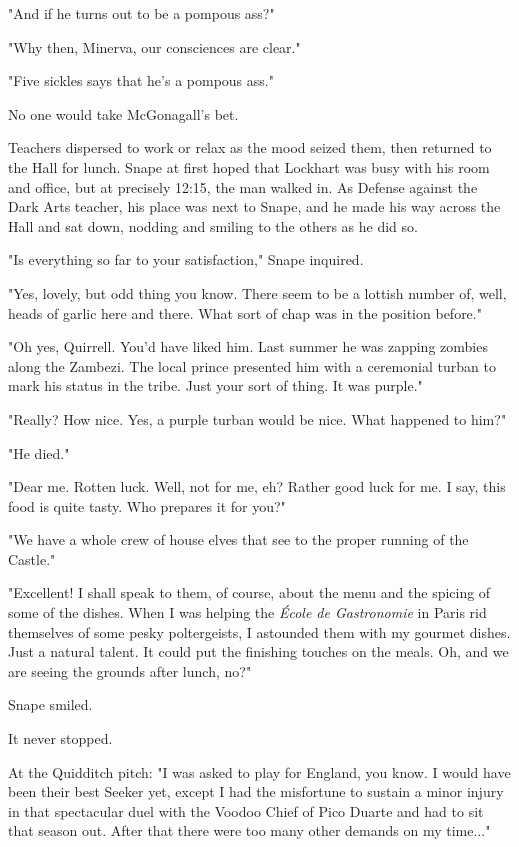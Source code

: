 \documentclass[a4paper,11pt]{article}
\begin{document}
"And if he turns out to be a pompous ass?"

"Why then, Minerva, our consciences are clear."

"Five sickles says that he's a pompous ass."

No one would take McGonagall's bet.

Teachers dispersed to work or relax as the mood seized them, then returned to the Hall for lunch. Snape at first hoped that Lockhart was busy with his room and office, but at precisely 12:15, the man walked in. As Defense against the Dark Arts teacher, his place was next to Snape, and he made his way across the Hall and sat down, nodding and smiling to the others as he did so.

"Is everything so far to your satisfaction," Snape inquired.

"Yes, lovely, but odd thing you know. There seem to be a lottish number of, well, heads of garlic here and there. What sort of chap was in the position before."

"Oh yes, Quirrell. You'd have liked him. Last summer he was zapping zombies along the Zambezi. The local prince presented him with a ceremonial turban to mark his status in the tribe. Just your sort of thing. It was purple."

"Really? How nice. Yes, a purple turban would be nice. What happened to him?"

"He died."

"Dear me. Rotten luck. Well, not for me, eh? Rather good luck for me. I say, this food is quite tasty. Who prepares it for you?"

"We have a whole crew of house elves that see to the proper running of the Castle."

"Excellent! I shall speak to them, of course, about the menu and the spicing of some of the dishes. When I was helping the \emph{École de Gastronomie} in Paris rid themselves of some pesky poltergeists, I astounded them with my gourmet dishes. Just a natural talent. It could put the finishing touches on the meals. Oh, and we are seeing the grounds after lunch, no?"

Snape smiled.

It never stopped.

At the Quidditch pitch: "I was asked to play for England, you know. I would have been their best Seeker yet, except I had the misfortune to sustain a minor injury in that spectacular duel with the Voodoo Chief of Pico Duarte and had to sit that season out. After that there were too many other demands on my time..."
\end{document}
